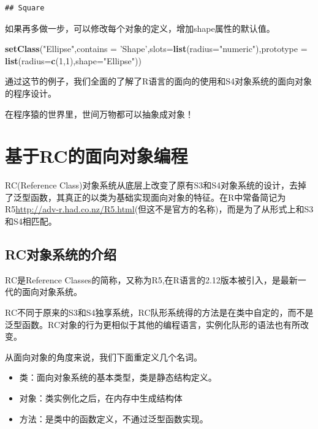\documentclass[]{book}
\newenvironment{Shaded}{\begin{snugshade}}{\end{snugshade}}
\newcommand{\KeywordTok}[1]{\textcolor[rgb]{0.13,0.29,0.53}{\textbf{#1}}}
\newcommand{\DataTypeTok}[1]{\textcolor[rgb]{0.13,0.29,0.53}{#1}}
\newcommand{\DecValTok}[1]{\textcolor[rgb]{0.00,0.00,0.81}{#1}}
\newcommand{\StringTok}[1]{\textcolor[rgb]{0.31,0.60,0.02}{#1}}
\newcommand{\NormalTok}[1]{#1}
\begin{document}
\begin{verbatim}
## Square
\end{verbatim}

如果再多做一步，可以修改每个对象的定义，增加shape属性的默认值。

\begin{Shaded}
\begin{Highlighting}[]
\KeywordTok{setClass}\NormalTok{(}\StringTok{"Ellipse"}\NormalTok{,}\DataTypeTok{contains =} \StringTok{'Shape'}\NormalTok{,}\DataTypeTok{slots=}\KeywordTok{list}\NormalTok{(}\DataTypeTok{radius=}\StringTok{"numeric"}\NormalTok{),}\DataTypeTok{prototype =} \KeywordTok{list}\NormalTok{(}\DataTypeTok{radius=}\KeywordTok{c}\NormalTok{(}\DecValTok{1}\NormalTok{,}\DecValTok{1}\NormalTok{),}\DataTypeTok{shape=}\StringTok{"Ellipse"}\NormalTok{))}
\end{Highlighting}
\end{Shaded}

通过这节的例子，我们全面的了解了R语言的面向的使用和S4对象系统的面向对象的程序设计。

在程序猿的世界里，世间万物都可以抽象成对象！

\chapter{基于RC的面向对象编程}\label{RC}

RC(Reference
Class)对象系统从底层上改变了原有S3和S4对象系统的设计，去掉了泛型函数，其真正的以类为基础实现面向对象的特征。在R中常备简记为R5\url{http://adv-r.had.co.nz/R5.html}(但这不是官方的名称)，而是为了从形式上和S3和S4相匹配。

\section{RC对象系统的介绍}\label{rc}

RC是Reference
Classes的简称，又称为R5,在R语言的2.12版本被引入，是最新一代的面向对象系统。

RC不同于原来的S3和S4独享系统，RC队形系统得的方法是在类中自定的，而不是泛型函数。RC对象的行为更相似于其他的编程语言，实例化队形的语法也有所改变。

从面向对象的角度来说，我们下面重定义几个名词。

\begin{itemize}
\item
  类：面向对象系统的基本类型，类是静态结构定义。
\item
  对象：类实例化之后，在内存中生成结构体
\item
  方法：是类中的函数定义，不通过泛型函数实现。
\end{itemize}
\end{document}
